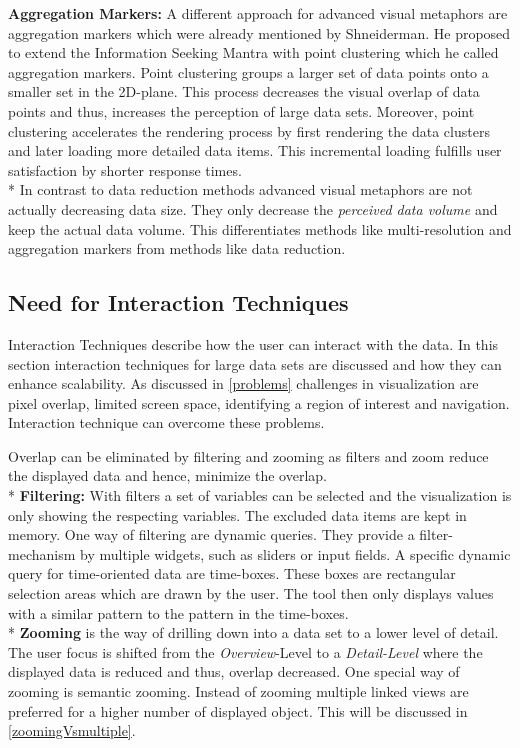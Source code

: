\textbf{Aggregation Markers:}\label{aggregationmarkers} A different approach for advanced visual metaphors are aggregation markers which were already mentioned by Shneiderman\cite{Shneiderman2008}. He proposed to extend the Information Seeking Mantra\cite{Shneiderman1996} with point clustering which he called aggregation markers. Point clustering groups a larger set of data points onto a smaller set in the 2D-plane\cite{Morrison2014}. This process decreases the visual overlap of data points and thus, increases the perception of large data sets. Moreover, point clustering accelerates the rendering process by first rendering the data clusters  and later loading more detailed data items. This incremental loading fulfills user satisfaction by shorter response times.\\*
In contrast to data reduction methods advanced visual metaphors are not actually decreasing data size. They only decrease the \textit{perceived data volume} and keep the actual data volume. This differentiates methods like multi-resolution and aggregation markers from methods like data reduction. 


\subsection{Need for Interaction Techniques}
Interaction Techniques describe how the user can interact with the data. In this section interaction techniques for large data sets are discussed and how they can enhance scalability. As discussed in \ref{problems} challenges in visualization are pixel overlap, limited screen space, identifying a region of interest and navigation. Interaction technique can overcome these problems. 
\par
Overlap can be eliminated by filtering and zooming as filters and zoom reduce the displayed data and hence, minimize the overlap. \\*
\textbf{Filtering:} With filters a set of variables can be selected and the visualization is only showing the respecting variables. The excluded data items are kept in memory.
One way of filtering are dynamic queries. They provide a filter-mechanism by multiple widgets, such as sliders or input fields\cite{Hochheiser2004,Shneiderman2008,Aigner2011}. A specific dynamic query for time-oriented data are time-boxes. These boxes are rectangular selection areas which are drawn by the user. The tool then only displays values with a similar pattern to the pattern in the time-boxes.\\*
\textbf{Zooming} is the way of drilling down into a data set to a lower level of detail. The user focus is shifted from the \textit{Overview}-Level to a \textit{Detail-Level} where the displayed data is reduced and thus, overlap decreased. One special way of zooming is semantic zooming\cite{boulos2003use}. Instead of zooming multiple linked views are preferred for a higher number of displayed object. This will be discussed in \ref{zoomingVsmultiple}. 
\par

